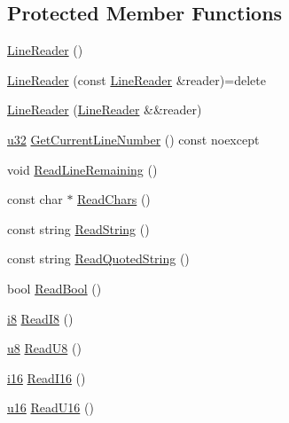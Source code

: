\subsection*{Protected Member Functions}
\begin{DoxyCompactItemize}
\item 
\hyperlink{classmage_1_1_line_reader_ab4a46321d7ea3ecda2d6390c78a7285b}{Line\+Reader} ()
\item 
\hyperlink{classmage_1_1_line_reader_ae4f871bebae110704b34c0bd88460639}{Line\+Reader} (const \hyperlink{classmage_1_1_line_reader}{Line\+Reader} \&reader)=delete
\item 
\hyperlink{classmage_1_1_line_reader_ad972c7100f726e7b061d864083ba0225}{Line\+Reader} (\hyperlink{classmage_1_1_line_reader}{Line\+Reader} \&\&reader)
\item 
\hyperlink{namespacemage_af2b398bf98eb10351f49cad73fe2cc73}{u32} \hyperlink{classmage_1_1_line_reader_a0a5d75bd999e4cf9611d3b4238d6ab50}{Get\+Current\+Line\+Number} () const noexcept
\item 
void \hyperlink{classmage_1_1_line_reader_a3a4b99bfef1e8a826d74a01bcc663fcb}{Read\+Line\+Remaining} ()
\item 
const char $\ast$ \hyperlink{classmage_1_1_line_reader_ad915c1a17549c7758c10f0b6db7e5611}{Read\+Chars} ()
\item 
const string \hyperlink{classmage_1_1_line_reader_a58a27b637574ce56ea17a575aa540675}{Read\+String} ()
\item 
const string \hyperlink{classmage_1_1_line_reader_ae9a7547d01b29c3237b198444d4f3aef}{Read\+Quoted\+String} ()
\item 
bool \hyperlink{classmage_1_1_line_reader_a86289c358afe9b3bc5c7789bb8a6af95}{Read\+Bool} ()
\item 
\hyperlink{namespacemage_ae590501eabc5b30d993320c2159423ee}{i8} \hyperlink{classmage_1_1_line_reader_ae637eb40ceb12c86325ccf01c00d93de}{Read\+I8} ()
\item 
\hyperlink{namespacemage_a5a362e2d56fc439362a80516ecae7828}{u8} \hyperlink{classmage_1_1_line_reader_a8a92596b33e4909c947a1b7a425310a1}{Read\+U8} ()
\item 
\hyperlink{namespacemage_a80228058266cc2ec5868d65b2a4c2f3c}{i16} \hyperlink{classmage_1_1_line_reader_a16891b35a155de02130730639448bfd5}{Read\+I16} ()
\item 
\hyperlink{namespacemage_aaf695d763e29d308a85ee22c6489344e}{u16} \hyperlink{classmage_1_1_line_reader_ab8ea17802d09e6ffee185057755ad944}{Read\+U16} ()
\item 

\end{DoxyCompactItemize}
